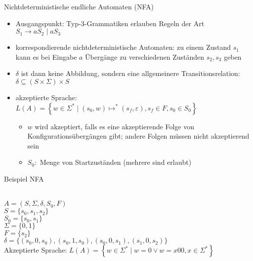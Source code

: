 \begin{frame}{Nichtdeterministische endliche Automaten (NFA)}
	\begin{itemize}
		\item Ausgangspunkt: Typ-3-Grammatiken erlauben Regeln der Art\\
		\quad $S_1 \rightarrow aS_2 \mid aS_3$
		\item korrespondierende nichtdeterministische Automaten: zu
		einem Zustand $s_1$ kann es bei Eingabe $a$ Übergänge zu
		verschiedenen Zuständen $s_2, s_3$ geben
		\item $\delta$ ist dann keine Abbildung, sondern eine allgemeinere Transitionsrelation:\\
		\quad $\delta \subseteq (S \times \Sigma) \times S$
		\item akzeptierte Sprache:\\
		\quad $L(A)=\left\{w \in \Sigma^* \mid (s_0,w) \mapsto^* (s_f, \varepsilon), s_f \in F, s_0 \in S_0 \right\}$
		\begin{itemize}
			\item $w$ wird akzeptiert, falls es eine akzeptierende Folge von Konfigurationsübergängen gibt; andere Folgen müssen nicht akzeptierend sein
			\item $S_0:$ Menge von Startzuständen (mehrere sind erlaubt)
		\end{itemize}
	\end{itemize}
\end{frame}

\begin{frame}{Beispiel NFA}
	\label{NFA_Beispiel}
	\\
	$A=(S, \Sigma, \delta, S_0, F)$\\
	$S=\{s_0, s_1, s_2\}$ \\
	$S_0=\{s_0, s_1\}$\\
	$\Sigma=\{0,1\}$\\
	$F=\{s_2\}$ \\
	$\delta=\{(s_0,0,s_0), (s_0, 1, s_0), (s_0, 0, s_1), (s_1, 0, s_2)\}$\\ 
	Akzeptierte Sprache: $L(A)=\left\{w \in \Sigma^* \mid w=0 \lor w=x00, x\in \Sigma^*\right\}$
\end{frame}

